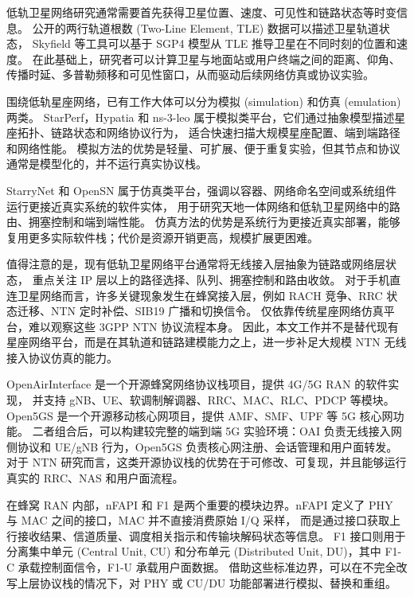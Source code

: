 
低轨卫星网络研究通常需要首先获得卫星位置、速度、可见性和链路状态等时变信息。
公开的两行轨道根数 (Two-Line Element, TLE) 数据可以描述卫星轨道状态，
Skyfield 等工具可以基于 SGP4 模型从 TLE 推导卫星在不同时刻的位置和速度\cite{skyfield,celestrak}。
在此基础上，研究者可以计算卫星与地面站或用户终端之间的距离、仰角、传播时延、多普勒频移和可见性窗口，从而驱动后续网络仿真或协议实验。

围绕低轨星座网络，已有工作大体可以分为模拟 (simulation) 和仿真 (emulation) 两类。
StarPerf，Hypatia 和 ns-3-leo 属于模拟类平台，它们通过抽象模型描述星座拓扑、链路状态和网络协议行为，
适合快速扫描大规模星座配置、端到端路径和网络性能\cite{hypatia,ns3leo,starperf}。
模拟方法的优势是轻量、可扩展、便于重复实验，但其节点和协议通常是模型化的，并不运行真实协议栈。

StarryNet 和 OpenSN 属于仿真类平台，强调以容器、网络命名空间或系统组件运行更接近真实系统的软件实体，
用于研究天地一体网络和低轨卫星网络中的路由、拥塞控制和端到端性能\cite{starrynet,opensn}。
仿真方法的优势是系统行为更接近真实部署，能够复用更多实际软件栈；代价是资源开销更高，规模扩展更困难。

值得注意的是，现有低轨卫星网络平台通常将无线接入层抽象为链路或网络层状态，
重点关注 IP 层以上的路径选择、队列、拥塞控制和路由收敛\cite{hypatia,starrynet,opensn}。
对于手机直连卫星网络而言，许多关键现象发生在蜂窝接入层，例如 RACH 竞争、RRC 状态迁移、NTN 定时补偿、SIB19 广播和切换信令。
仅依靠传统星座网络仿真平台，难以观察这些 3GPP NTN 协议流程本身。
因此，本文工作并不是替代现有星座网络平台，而是在其轨道和链路建模能力之上，进一步补足大规模 NTN 无线接入协议仿真的能力。


OpenAirInterface 是一个开源蜂窝网络协议栈项目，提供 4G/5G RAN 的软件实现，
并支持 gNB、UE、软调制解调器、RRC、MAC、RLC、PDCP 等模块\cite{oai}。
Open5GS 是一个开源移动核心网项目，提供 AMF、SMF、UPF 等 5G 核心网功能\cite{open5gs}。
二者组合后，可以构建较完整的端到端 5G 实验环境：OAI 负责无线接入网侧协议和 UE/gNB 行为，Open5GS 负责核心网注册、会话管理和用户面转发。
对于 NTN 研究而言，这类开源协议栈的优势在于可修改、可复现，并且能够运行真实的 RRC、NAS 和用户面流程。

在蜂窝 RAN 内部，nFAPI 和 F1 是两个重要的模块边界。nFAPI 定义了 PHY 与 MAC 之间的接口，MAC 并不直接消费原始 I/Q 采样，
而是通过接口获取上行接收结果、信道质量、调度相关指示和传输块解码状态等信息。
F1 接口则用于分离集中单元 (Central Unit, CU) 和分布单元 (Distributed Unit, DU)，其中 F1-C 承载控制面信令，F1-U 承载用户面数据。
借助这些标准边界，可以在不完全改写上层协议栈的情况下，对 PHY 或 CU/DU 功能部署进行模拟、替换和重组。

